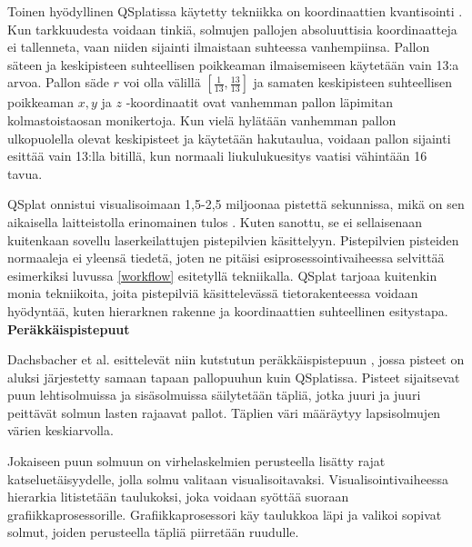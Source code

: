 Toinen hyödyllinen QSplatissa käytetty tekniikka on koordinaattien kvantisointi . Kun tarkkuudesta voidaan tinkiä, solmujen pallojen absoluuttisia koordinaatteja ei tallenneta, vaan niiden sijainti ilmaistaan suhteessa vanhempiinsa. Pallon säteen ja keskipisteen suhteellisen poikkeaman ilmaisemiseen käytetään vain 13:a arvoa. Pallon säde $r$ voi olla välillä $[\frac{1}{13}, \frac{13}{13}]$ ja samaten keskipisteen suhteellisen poikkeaman $x, y$ ja $z$ -koordinaatit ovat vanhemman pallon läpimitan kolmastoistaosan monikertoja. Kun vielä hylätään vanhemman pallon ulkopuolella olevat keskipisteet ja käytetään hakutaulua, voidaan pallon sijainti esittää vain 13:lla bitillä, kun normaali liukulukuesitys vaatisi vähintään 16 tavua. \cite{qsplat}

QSplat onnistui visualisoimaan 1,5-2,5 miljoonaa pistettä sekunnissa, mikä on sen aikaisella laitteistolla erinomainen tulos \cite{qsplat}. Kuten sanottu, se ei sellaisenaan kuitenkaan sovellu laserkeilattujen pistepilvien käsittelyyn. Pistepilvien pisteiden normaaleja ei yleensä tiedetä, joten ne pitäisi esiprosessointivaiheessa selvittää esimerkiksi luvussa \ref{workflow} esitetyllä tekniikalla. QSplat tarjoaa kuitenkin monia tekniikoita, joita pistepilviä käsittelevässä tietorakenteessa voidaan hyödyntää, kuten hierarknen rakenne ja koordinaattien suhteellinen esitystapa.
\\


\noindent\large\textbf{Peräkkäispistepuut}
\normalsize

\noindent Dachsbacher et al. esittelevät niin kutstutun peräkkäispistepuun , jossa pisteet on aluksi järjestetty samaan tapaan pallopuuhun kuin QSplatissa. Pisteet sijaitsevat puun lehtisolmuissa ja sisäsolmuissa säilytetään täpliä, jotka juuri ja juuri peittävät solmun lasten rajaavat pallot. Täplien väri määräytyy lapsisolmujen värien keskiarvolla. \cite{spt}

Jokaiseen puun solmuun on virhelaskelmien perusteella lisätty rajat katseluetäisyydelle, jolla solmu valitaan visualisoitavaksi. Visualisointivaiheessa hierarkia litistetään taulukoksi, joka voidaan syöttää suoraan grafiikkaprosessorille. Grafiikkaprosessori käy taulukkoa läpi ja valikoi sopivat solmut, joiden perusteella täpliä piirretään ruudulle. \cite{spt}

